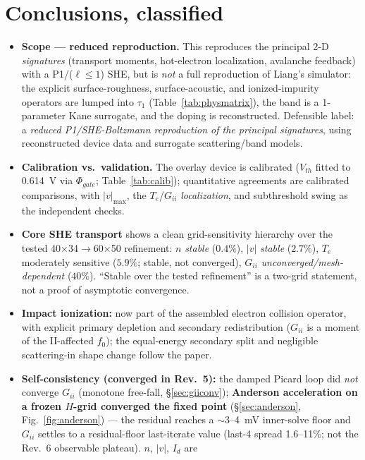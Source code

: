 \documentclass[11pt]{article}
\begin{document}
\section{Conclusions, classified}\label{sec:concl}
\begin{itemize}[leftmargin=1.4em,itemsep=2pt]
\item \textbf{Scope --- reduced reproduction.} This reproduces the principal 2-D \emph{signatures}
(transport moments, hot-electron localization, avalanche feedback) with a P1/($\ell\le1$) SHE, but
is \emph{not} a full reproduction of Liang's simulator: the explicit surface-roughness,
surface-acoustic, and ionized-impurity operators are lumped into $\tau_1$
(Table~\ref{tab:physmatrix}), the band is a 1-parameter Kane surrogate, and the doping is
reconstructed. Defensible label: a \emph{reduced P1/SHE-Boltzmann reproduction of the principal
signatures}, using reconstructed device data and surrogate scattering/band models.
\item \textbf{Calibration vs.\ validation.} The overlay device is calibrated ($V_{th}$ fitted to
\SI{0.614}{V} via $\Phi_{gate}$; Table~\ref{tab:calib}); quantitative agreements are calibrated
comparisons, with $|v|_{\max}$, the $T_e$/$G_{ii}$ \emph{localization}, and subthreshold swing as
the independent checks.
\item \textbf{Core SHE transport} shows a clean grid-sensitivity hierarchy over the tested
40$\times$34$\to$60$\times$50 refinement: $n$ \emph{stable} ($0.4\%$), $|v|$ \emph{stable}
($2.7\%$), $T_e$ moderately sensitive ($5.9\%$; stable, not converged), $G_{ii}$
\emph{unconverged/mesh-dependent} ($40\%$). ``Stable over the tested refinement'' is a two-grid
statement, not a proof of asymptotic convergence.
\item \textbf{Impact ionization:} now part of the assembled electron collision operator, with
explicit primary depletion and secondary redistribution ($G_{ii}$ is a moment of the II-affected
$f_0$); the equal-energy secondary split and negligible scattering-in shape change follow the
paper.
\item \textbf{Self-consistency (converged in Rev.~5):} the damped Picard loop did \emph{not}
converge $G_{ii}$ (monotone free-fall, \S\ref{sec:giiconv}); \textbf{Anderson acceleration on a
frozen $H$-grid converged the fixed point} (\S\ref{sec:anderson}, Fig.~\ref{fig:anderson}) --- the
residual reaches a $\sim$3--4~mV inner-solve floor and $G_{ii}$ settles to a residual-floor
last-iterate value (last-4 spread 1.6--11\%; not the Rev.~6 observable plateau). $n$, $|v|$, $I_d$ are

\end{itemize}
\end{document}
